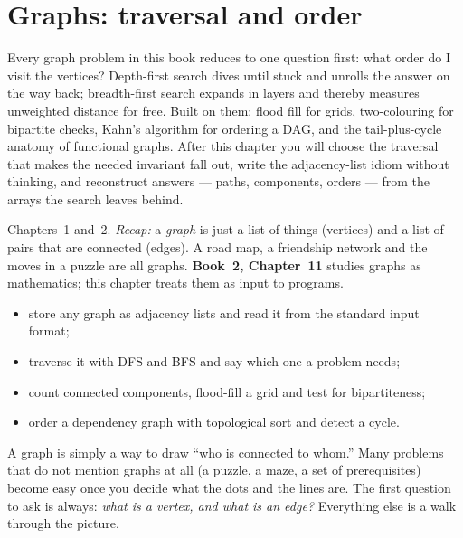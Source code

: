 \chapter{Graphs: traversal and order}\label{ch:graphs}

Every graph problem in this book reduces to one question first: what
order do I visit the vertices? Depth-first search dives until stuck
and unrolls the answer on the way back; breadth-first search expands
in layers and thereby measures unweighted distance for free. Built on
them: flood fill for grids, two-colouring for bipartite checks,
Kahn's algorithm for ordering a DAG, and the tail-plus-cycle anatomy
of functional graphs. After this chapter you will choose the
traversal that makes the needed invariant fall out, write the
adjacency-list idiom without thinking, and reconstruct answers ---
paths, components, orders --- from the arrays the search leaves
behind.

\begin{rulebox}
Chapters~1 and~2. \emph{Recap:} a \emph{graph} is just a list of things (vertices) and a list of pairs that are connected (edges). A road map, a friendship network and the moves in a puzzle are all graphs. \textbf{Book~2, Chapter~11} studies graphs as mathematics; this chapter treats them as input to programs.
\end{rulebox}
\begin{wins}
\begin{itemize}
\item store any graph as adjacency lists and read it from the standard input format;
\item traverse it with DFS and BFS and say which one a problem needs;
\item count connected components, flood-fill a grid and test for bipartiteness;
\item order a dependency graph with topological sort and detect a cycle.
\end{itemize}
\end{wins}
\begin{principle}
A graph is simply a way to draw ``who is connected to whom.'' Many problems that do not mention graphs at all (a puzzle, a maze, a set of prerequisites) become easy once you decide what the dots and the lines are. The first question to ask is always: \emph{what is a vertex, and what is an edge?} Everything else is a walk through the picture.
\end{principle}

